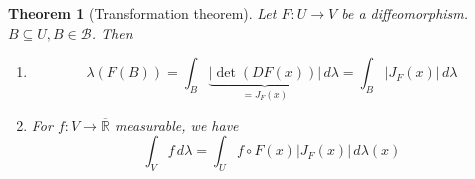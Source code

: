 \documentclass{article}
\newtheorem{theorem}{Theorem}  \numberwithin{theorem}{section}
\newcommand{\card}[1]{\left|#1\right|}
\begin{document}
\begin{theorem}[Transformation theorem]
  Let $F: U \to V$ be a diffeomorphism. $B \subseteq U, B \in \mathcal B$. Then
  \begin{enumerate}
    \item \[ \lambda(F(B)) = \int_B \underbrace{\card{\det(DF(x))}}_{= J_F(x)} \, d\lambda = \int_B \card{J_F(x)} \, d\lambda \]
    \item For $f: V \to \overline{\mathbb R}$ measurable, we have
      \[ \int_V f \, d\lambda = \int_U f \circ F(x) \card{J_F(x)} \, d\lambda(x) \]
  \end{enumerate}
\end{theorem}

\printindex
\end{document}
